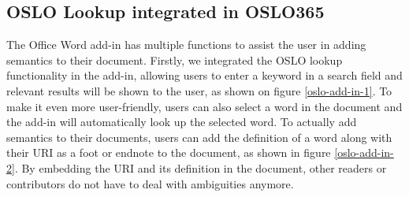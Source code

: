 \documentclass[manuscript]{acmart}
\begin{document}
\subsection{OSLO Lookup integrated in OSLO365}

The Office Word add-in has multiple functions to assist the user in adding semantics to their document. 
Firstly, we integrated the OSLO lookup functionality in the add-in, allowing users to enter a keyword in a search field and relevant results will be shown to the user, as shown on figure \ref{oslo-add-in-1}. 
To make it even more user-friendly, users can also select a word in the document and the add-in will automatically look up the selected word. 
To actually add semantics to their documents, users can add the definition of a word along with their URI as a foot or endnote to the document, as shown in figure \ref{oslo-add-in-2}.
By embedding the URI and its definition in the document, other readers or contributors do not have to deal with ambiguities anymore.
\end{document}
